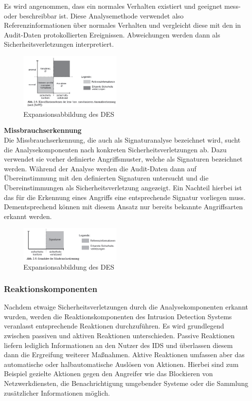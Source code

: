 \documentclass[11pt]{scrartcl}
\begin{document}
Es wird angenommen, dass ein normales Verhalten existiert und geeignet mess- oder beschreibbar ist. Diese Analysemethode verwendet also Referenzinformationen über normales Verhalten und
vergleicht diese mit den in Audit-Daten protokollierten Ereignissen. Abweichungen
werden dann als Sicherheitsverletzungen interpretiert.\\

\begin{figure}
\includegraphics[width=0.45\textwidth]{aa4.png}
	\caption{Expansionsabbildung des DES \cite{5}}
	\label{fig3}
\end{figure} \noindent
\textbf{Missbrauchserkennung}\\
Die Missbrauchserkennung, die auch als Signaturanalyse
bezeichnet wird, sucht die Analysekomponenten nach konkreten Sicherheitsverletzungen ab. Dazu verwendet sie vorher definierte Angriffsmuster, welche als Signaturen bezeichnet werden. Während der Analyse werden die Audit-Daten dann auf Übereinstimmung mit den definierten
Signaturen untersucht und die Übereinstimmungen als Sicherheitsverletzung
angezeigt. Ein Nachteil hierbei ist das für die Erkennung eines Angriffs eine entsprechende Signatur vorliegen muss. Dementsprechend können mit diesem Ansatz nur bereits bekannte Angriffsarten erkannt werden.\\
\begin{figure}
\includegraphics[width=0.45\textwidth]{aa5.png}
	\caption{Expansionsabbildung des DES \cite{5}}
	\label{fig4}
\end{figure} \noindent
\subsubsection{Reaktionskomponenten}
\label{sec:reaction}
Nachdem etwaige Sicherheitsverletzungen durch die Analysekomponenten erkannt
wurden, werden die Reaktionskomponenten des Intrusion Detection Systems veranlasst entsprechende
Reaktionen durchzuführen. Es wird grundlegend zwischen passiven
und aktiven Reaktionen unterschieden. Passive Reaktionen liefern lediglich Informationen
an den Nutzer des IDS und überlassen diesem dann die Ergreifung
weiterer Maßnahmen. Aktive Reaktionen umfassen aber das automatische oder
halbautomatische Auslösen von Aktionen. Hierbei sind zum Beispiel gezielte Aktionen gegen den Angreifer wie das Blockieren von Netzwerkdiensten, die Benachrichtigung umgebender Systeme oder die Sammlung zusätzlicher Informationen möglich. \cite{5}
\end{document}
